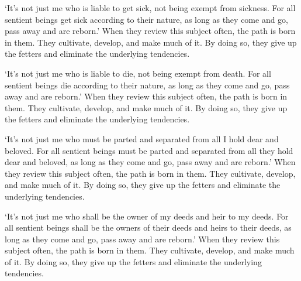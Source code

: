 \documentclass[12pt,openany]{book}%
\begin{document}
‘It’s not just me who is liable to get sick, not being exempt from sickness. For all sentient beings get sick according to their nature, as long as they come and go, pass away and are reborn.’ When they review this subject often, the path is born in them. They cultivate, develop, and make much of it. By doing so, they give up the fetters and eliminate the underlying tendencies. 

‘It’s not just me who is liable to die, not being exempt from death. For all sentient beings die according to their nature, as long as they come and go, pass away and are reborn.’ When they review this subject often, the path is born in them. They cultivate, develop, and make much of it. By doing so, they give up the fetters and eliminate the underlying tendencies. 

‘It’s not just me who must be parted and separated from all I hold dear and beloved. For all sentient beings must be parted and separated from all they hold dear and beloved, as long as they come and go, pass away and are reborn.’ When they review this subject often, the path is born in them. They cultivate, develop, and make much of it. By doing so, they give up the fetters and eliminate the underlying tendencies. 

‘It’s not just me who shall be the owner of my deeds and heir to my deeds. For all sentient beings shall be the owners of their deeds and heirs to their deeds, as long as they come and go, pass away and are reborn.’ When they review this subject often, the path is born in them. They cultivate, develop, and make much of it. By doing so, they give up the fetters and eliminate the underlying tendencies. 
\end{document}

